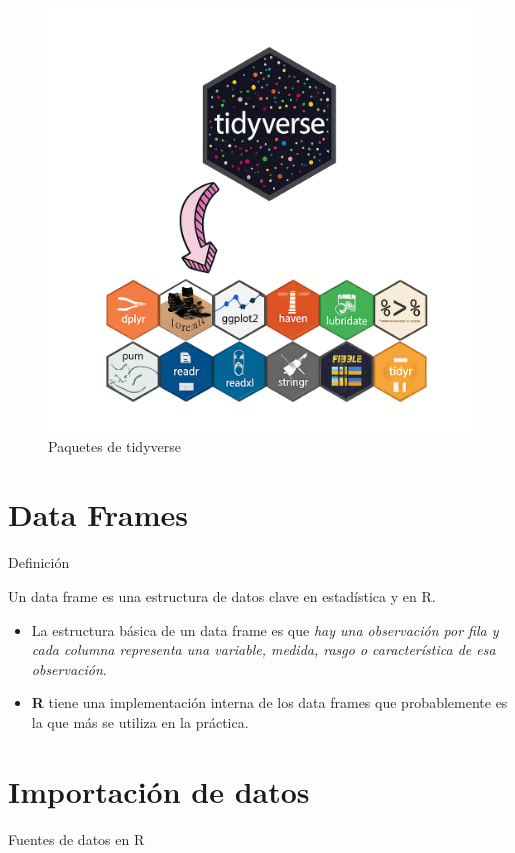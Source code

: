 \documentclass[
]{book}
\providecommand{\tightlist}{%
  \setlength{\itemsep}{0pt}\setlength{\parskip}{0pt}}
\begin{document}
\begin{figure}

{\centering \includegraphics[width=0.7\linewidth]{images/tidypacsinfondo} 

}

\caption{Paquetes de tidyverse}\label{fig:tidy-fig}
\end{figure}

\section{Data Frames}\label{data-frames}

{} Definición

Un data frame es una estructura de datos clave en estadística y en R.

\begin{itemize}
\tightlist
\item
  La estructura básica de un data frame es que \emph{hay una observación por fila y cada columna representa una variable, medida, rasgo o característica de esa observación}.\\
\item
  \textbf{R} tiene una implementación interna de los data frames que probablemente es la que más se utiliza en la práctica.
\end{itemize}

\section{Importación de datos}\label{importaciuxf3n-de-datos}

{} Fuentes de datos en R
\end{document}
